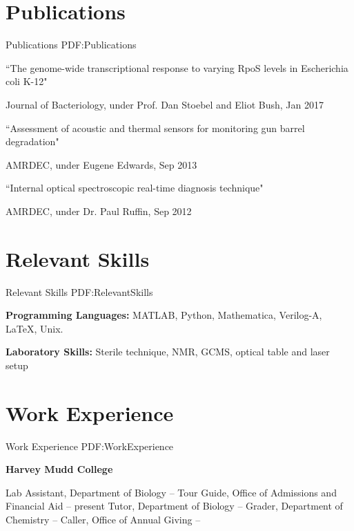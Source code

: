 \documentclass[letterpaper,10pt,oneside]{article}
\begin{document}
\begin{body}

\section
{Publications}
{Publications}
{PDF:Publications}

\BulletItemBullet
``The genome-wide transcriptional response to varying RpoS levels in Escherichia coli K-12"
\begin{detail}
\SubBulletItem
Journal of Bacteriology, under Prof. Dan Stoebel and Eliot Bush, Jan 2017
\end{detail}

\Gap

\BulletItemBullet
``Assessment of acoustic and thermal sensors for monitoring gun barrel degradation"
\begin{detail}
\SubBulletItem
AMRDEC, under Eugene Edwards, Sep 2013
\end{detail}

\Gap

\BulletItemBullet
``Internal optical spectroscopic real-time diagnosis technique"
\begin{detail}
\SubBulletItem
AMRDEC, under Dr. Paul Ruffin, Sep 2012
\end{detail}


\section
{Relevant Skills}
{Relevant Skills}
{PDF:RelevantSkills}

{\textbf{Programming Languages:}}
MATLAB, Python, Mathematica, Verilog-A, \LaTeX, Unix.

\Gap

{\textbf{Laboratory Skills:}}
Sterile technique, NMR, GCMS, optical table and laser setup


\section
{Work Experience}
{Work Experience}
{PDF:WorkExperience}

{\textbf{Harvey Mudd College}}

\GapNoBreak
\BulletItem
Lab Assistant, Department of Biology \hfill
{} --
\BulletItem
Tour Guide, Office of Admissions and Financial Aid \hfill
{} --
present
\BulletItem
Tutor, Department of Biology \hfill
{} --
\BulletItem
Grader, Department of Chemistry \hfill
{} --
\BulletItem
Caller, Office of Annual Giving \hfill
{} --


\end{body}
\end{document}
